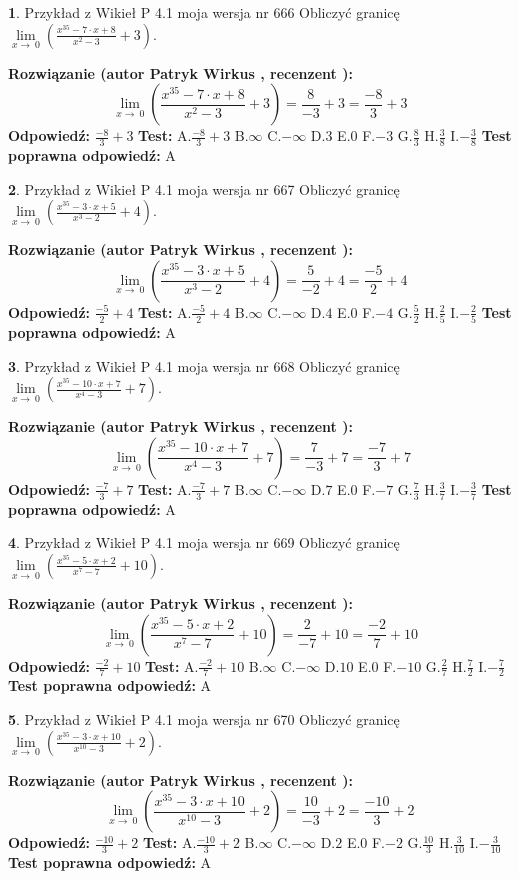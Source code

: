 \documentclass[12pt, a4paper]{article}
\theoremstyle{definition} %
\newtheorem{zad}{}
\newcommand{\zadStart}[1]{\begin{zad}#1\newline}
\newcommand{\zadStop}{\end{zad}}
\newcommand{\rozwStart}[2]{\noindent \textbf{Rozwiązanie (autor #1 , recenzent #2): }\newline}
\newcommand{\rozwStop}{\newline}
\newcommand{\odpStart}{\noindent \textbf{Odpowiedź:}\newline}
\newcommand{\odpStop}{\newline}
\newcommand{\testStart}{\noindent \textbf{Test:}\newline}
\newcommand{\testStop}{\newline}
\newcommand{\kluczStart}{\noindent \textbf{Test poprawna odpowiedź:}\newline}
\newcommand{\kluczStop}{\newline}
\begin{document}
\zadStart{Przykład z Wikieł P 4.1 moja wersja nr 666}
Obliczyć granicę $\lim\limits_{x\to\ 0}(\frac{x^{35}-7 \cdot x +8}{x^{2}-3}+3)$.
\zadStop
\rozwStart{Patryk Wirkus}{}
$$\lim\limits_{x\to\ 0}(\frac{x^{35}-7 \cdot x +8}{x^{2}-3}+3)=\frac{8}{-3}+3=\frac{-8}{3}+3$$
\rozwStop
\odpStart
$\frac{-8}{3}+3$
\odpStop
\testStart
A.$\frac{-8}{3}+3$
B.$\infty$
C.$-\infty$
D.$3$
E.$0$
F.$-3$
G.$\frac{8}{3}$
H.$\frac{3}{8}$
I.$-\frac{3}{8}$
\testStop
\kluczStart
A
\kluczStop



\zadStart{Przykład z Wikieł P 4.1 moja wersja nr 667}
Obliczyć granicę $\lim\limits_{x\to\ 0}(\frac{x^{35}-3 \cdot x +5}{x^{3}-2}+4)$.
\zadStop
\rozwStart{Patryk Wirkus}{}
$$\lim\limits_{x\to\ 0}(\frac{x^{35}-3 \cdot x +5}{x^{3}-2}+4)=\frac{5}{-2}+4=\frac{-5}{2}+4$$
\rozwStop
\odpStart
$\frac{-5}{2}+4$
\odpStop
\testStart
A.$\frac{-5}{2}+4$
B.$\infty$
C.$-\infty$
D.$4$
E.$0$
F.$-4$
G.$\frac{5}{2}$
H.$\frac{2}{5}$
I.$-\frac{2}{5}$
\testStop
\kluczStart
A
\kluczStop



\zadStart{Przykład z Wikieł P 4.1 moja wersja nr 668}
Obliczyć granicę $\lim\limits_{x\to\ 0}(\frac{x^{35}-10 \cdot x +7}{x^{4}-3}+7)$.
\zadStop
\rozwStart{Patryk Wirkus}{}
$$\lim\limits_{x\to\ 0}(\frac{x^{35}-10 \cdot x +7}{x^{4}-3}+7)=\frac{7}{-3}+7=\frac{-7}{3}+7$$
\rozwStop
\odpStart
$\frac{-7}{3}+7$
\odpStop
\testStart
A.$\frac{-7}{3}+7$
B.$\infty$
C.$-\infty$
D.$7$
E.$0$
F.$-7$
G.$\frac{7}{3}$
H.$\frac{3}{7}$
I.$-\frac{3}{7}$
\testStop
\kluczStart
A
\kluczStop



\zadStart{Przykład z Wikieł P 4.1 moja wersja nr 669}
Obliczyć granicę $\lim\limits_{x\to\ 0}(\frac{x^{35}-5 \cdot x +2}{x^{7}-7}+10)$.
\zadStop
\rozwStart{Patryk Wirkus}{}
$$\lim\limits_{x\to\ 0}(\frac{x^{35}-5 \cdot x +2}{x^{7}-7}+10)=\frac{2}{-7}+10=\frac{-2}{7}+10$$
\rozwStop
\odpStart
$\frac{-2}{7}+10$
\odpStop
\testStart
A.$\frac{-2}{7}+10$
B.$\infty$
C.$-\infty$
D.$10$
E.$0$
F.$-10$
G.$\frac{2}{7}$
H.$\frac{7}{2}$
I.$-\frac{7}{2}$
\testStop
\kluczStart
A
\kluczStop



\zadStart{Przykład z Wikieł P 4.1 moja wersja nr 670}
Obliczyć granicę $\lim\limits_{x\to\ 0}(\frac{x^{35}-3 \cdot x +10}{x^{10}-3}+2)$.
\zadStop
\rozwStart{Patryk Wirkus}{}
$$\lim\limits_{x\to\ 0}(\frac{x^{35}-3 \cdot x +10}{x^{10}-3}+2)=\frac{10}{-3}+2=\frac{-10}{3}+2$$
\rozwStop
\odpStart
$\frac{-10}{3}+2$
\odpStop
\testStart
A.$\frac{-10}{3}+2$
B.$\infty$
C.$-\infty$
D.$2$
E.$0$
F.$-2$
G.$\frac{10}{3}$
H.$\frac{3}{10}$
I.$-\frac{3}{10}$
\testStop
\kluczStart
A
\kluczStop
\end{document}
